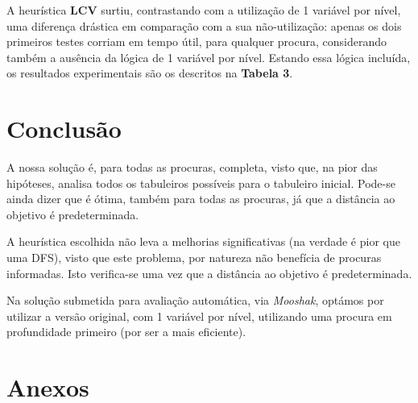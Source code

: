 \documentclass[12pt,a4paper]{article}
\begin{document}
A heurística \textbf{LCV} surtiu, contrastando com a utilização de 1 variável por nível, uma diferença drástica em comparação com a sua não-utilização: apenas os dois primeiros testes corriam em tempo útil, para qualquer procura, considerando também a ausência da lógica de 1 variável por nível.
 Estando essa lógica incluída, os resultados experimentais são os descritos na \textbf{Tabela 3}.

\section*{Conclusão}

A nossa solução é, para todas as procuras, completa, visto que, na pior das hipóteses, analisa todos os tabuleiros possíveis para o tabuleiro inicial.
 Pode-se ainda dizer que é ótima, também para todas as procuras, já que a distância ao objetivo é predeterminada.

A heurística escolhida não leva a melhorias significativas (na verdade é pior que uma DFS), visto que este problema, por natureza não benefícia de procuras informadas.
Isto verifica-se uma vez que a distância ao objetivo é predeterminada.

 Na solução submetida para avaliação automática, via \textit{Mooshak}, optámos por utilizar a versão original, com 1 variável por nível, utilizando uma procura em profundidade primeiro (por ser a mais eficiente).

\section*{Anexos}

\end{document}
